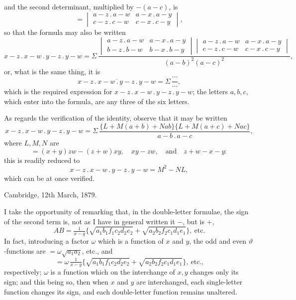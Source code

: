\documentclass[11pt]{article}
\begin{document}
and the second determinant, multiplied by $-(a-c)$, is
\[
= \begin{vmatrix} a-z\mathbin{.}a-w & a-x\mathbin{.}a-y \\ c-z\mathbin{.}c-w & c-x\mathbin{.}c-y \end{vmatrix},
\]
so that the formula may also be written
\[
x-z\mathbin{.}x-w\mathbin{.}y-z\mathbin{.}y-w = \Sigma\,\frac{\begin{vmatrix} a-z\mathbin{.}a-w & a-x\mathbin{.}a-y \\ b-z\mathbin{.}b-w & b-x\mathbin{.}b-y \end{vmatrix}\begin{vmatrix} a-z\mathbin{.}a-w & a-x\mathbin{.}a-y \\ c-z\mathbin{.}c-w & c-x\mathbin{.}c-y \end{vmatrix}}{(a-b)^2(a-c)^2},
\]
or, what is the same thing, it is
\[
\overline{x-z\mathbin{.}x-w\mathbin{.}y-z\mathbin{.}y-w} = \Sigma\,\frac{\cdots}{\cdots},
\]
which is the required expression for $x-z\mathbin{.}x-w\mathbin{.}y-z\mathbin{.}y-w$; the letters $a,b,c$, which enter into the formula, are any three of the six letters.

As regards the verification of the identity, observe that it may be written
\[
x-z\mathbin{.}x-w\mathbin{.}y-z\mathbin{.}y-w = \Sigma\,\frac{\{L + M(a+b) + Nab\}\{L + M(a+c) + Nac\}}{a-b\mathbin{.}a-c},
\]
where $L,M,N$ are
\[
=(x+y)zw - (z+w)xy,\quad xy - zw,\quad\text{and}\quad z+w-x-y:
\]
this is readily reduced to
\[
x-z\mathbin{.}x-w\mathbin{.}y-z\mathbin{.}y-w = M^2 - NL,
\]
which can be at once verified.

\medskip
\hfill Cambridge, 12th March, 1879.

\bigskip

I take the opportunity of remarking that, in the double-letter formulae, the sign of the second term is, not as I have in general written it $-$, but is $+$,
\[
AB = \tfrac{1}{x-y}\bigl\{\sqrt{a_1 b_1 f_1 c_2 d_2 e_2} + \sqrt{a_2 b_2 f_2 c_1 d_1 e_1}\bigr\},\ \text{etc.}
\]
In fact, introducing a factor $\omega$ which is a function of $x$ and $y$, the odd and even $\vartheta$-functions are $= \omega\sqrt{a_1 a_2}$, etc., and
\[
= \omega\,\tfrac{1}{x-y}\bigl\{\sqrt{a_1 b_1 f_1 c_2 d_2 e_2} + \sqrt{a_2 b_2 f_2 c_1 d_1 e_1}\bigr\},\ \text{etc.,}
\]
respectively; $\omega$ is a function which on the interchange of $x,y$ changes only its sign; and this being so, then when $x$ and $y$ are interchanged, each single-letter function changes its sign, and each double-letter function remains unaltered.
\end{document}
